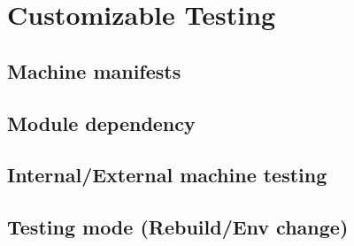 \section{Customizable Testing}

\subsection{Machine manifests}
\subsection{Module dependency}
\subsection{Internal/External machine testing}
\subsection{Testing mode (Rebuild/Env change)}
